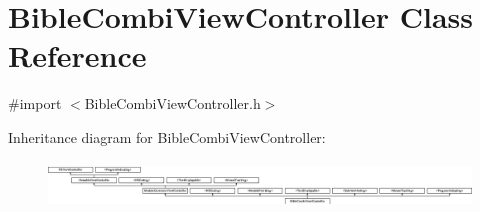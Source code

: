 \hypertarget{interface_bible_combi_view_controller}{\section{Bible\-Combi\-View\-Controller Class Reference}
\label{interface_bible_combi_view_controller}
}


{\ttfamily \#import $<$Bible\-Combi\-View\-Controller.\-h$>$}

Inheritance diagram for Bible\-Combi\-View\-Controller\-:\begin{figure}[H]
\begin{center}
\leavevmode
\includegraphics[height=1.244444cm]{interface_bible_combi_view_controller}
\end{center}
\end{figure}
